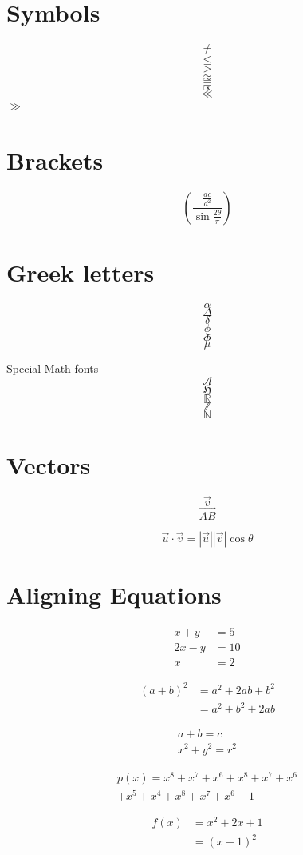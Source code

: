 \documentclass[17pt]{extarticle}
\begin{document}
\section{Symbols}
$$\neq$$
$$\leq$$
$$\geq$$
$$\approx$$
$$\equiv$$
$$\propto$$
$$\ll$$
$\gg$

\section{Brackets}
\[
    \left( \frac{\frac{ac}{d^2}}{\sin{\frac{2\theta}{\pi}}} \right)
\]


\section{Greek letters}
$$\alpha$$
$$\Delta$$
$$\delta$$
$$\phi$$
$$\Phi$$
$$\mu$$

Special Math fonts
$$\mathcal{A}$$
$$\mathfrak{H}$$
$$\mathbb{R}$$
$$\mathbb{Z}$$
$$\mathbb{N}$$

\section{Vectors}
$$\Vec{v}$$
$$\Vec{AB}$$

$$\vec{u} \cdot \vec{v} = |\vec{u}||\vec{v}|\cos{\theta}$$

\section{Aligning Equations}
\begin{align}
    x + y &= 5 \\
    2x - y &= 10 \\
    x &=2
\end{align}

\begin{align*}
    (a+b)^2 &= a^2 + 2ab + b^2 \\
    &= a^2 +b^2 + 2ab
\end{align*}

\begin{gather*}
    a+b = c \\
    x^2 + y^2 =r^2
\end{gather*}

\begin{multline}
    p(x) = x^8 + x^7 + x^6 + x^8 + x^7 + x^6  \\
    +x^5 + x^4 + x^8 + x^7 + x^6 +1
\end{multline}

\begin{equation}
    \begin{split}
        f(x) &= x^2 + 2x+1\\
        &= (x+1) ^2
    \end{split}
\end{equation}
\end{document}
